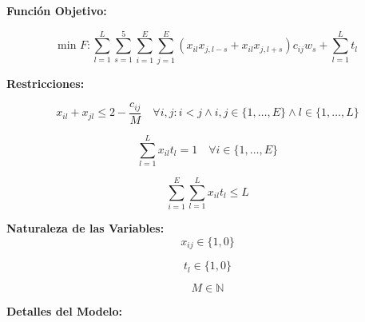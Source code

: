 \documentclass[letter, 10pt]{article}
\begin{document}
\textbf{Función Objetivo:}

\begin{equation} \label{eq:1}
	\text{min } F: \sum_{l=1}^{L} \sum_{s=1}^{5} \sum_{i=1}^{E} \sum_{j=1}^{E} (x_{il}x_{j,l-s} + x_{il}x_{j,l+s}) c_{ij} w_{s} + \sum_{l=1}^{L} t_{l}
\end{equation}

\textbf{Restricciones:}

\begin{equation} \label{eq:2}
	x_{il} + x_{jl} \leq 2 - \frac{c_{ij}}{M} \quad \forall i, j : i<j \wedge i, j \in \{1, \ldots, E\} \wedge l \in \{1, \ldots, L\}
\end{equation}

\begin{equation} \label{eq:3}
	\sum_{l=1}^{L} x_{il}t_l = 1 \quad \forall i \in \{1, \ldots, E\}
\end{equation}

\begin{equation} \label{eq:4}
	\sum_{i=1}^{E} \sum_{l=1}^{L} x_{il}t_l \leq L
\end{equation}

\textbf{Naturaleza de las Variables:}
\begin{equation*}
	x_{ij} \in \{1, 0\}
\end{equation*}

\begin{equation*}
	t_{l} \in \{1, 0\}
\end{equation*}

\begin{equation*}
	M \in \mathbb N
\end{equation*}

\textbf{Detalles del Modelo:}
\end{document}

